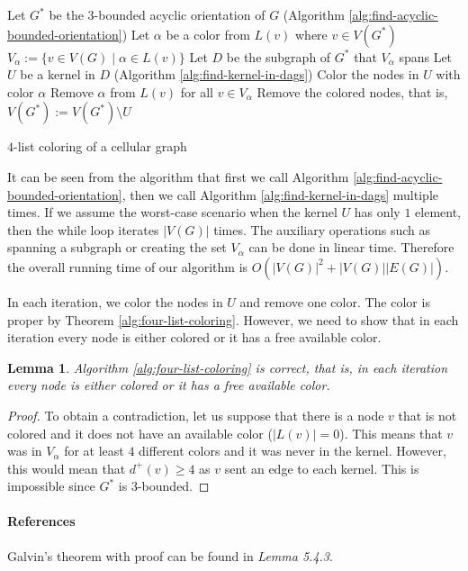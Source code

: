 \documentclass[a4paper, 12pt]{article}
\newtheorem{lem}{Lemma}[section]
\begin{document}
\begin{algorithm}[h!]\label{alg:four-list-coloring}
  Let $G^*$ be the $3$-bounded acyclic orientation of $G$ (Algorithm \ref{alg:find-acyclic-bounded-orientation})\;
   {
  	Let $\alpha$ be a color from $L(v)$ where $v \in V(G^*)$\;
  	$V_\alpha := \lbrace v \in V(G) \mid \alpha \in L(v) \rbrace$\;
  	Let $D$ be the subgraph of $G^*$ that $V_\alpha$ spans\;
  	Let $U$ be a kernel in $D$ (Algorithm \ref{alg:find-kernel-in-dags})\;
  	Color the nodes in $U$ with color $\alpha$\;
  	Remove $\alpha$ from $L(v)$ for all $v \in V_\alpha$\;
  	Remove the colored nodes, that is, $V(G^*) := V(G^*) \setminus U$\;
  }
 \caption{$4$-list coloring of a cellular graph}
\end{algorithm}

It can be seen from the algorithm that first we call Algorithm \ref{alg:find-acyclic-bounded-orientation}, then we call Algorithm \ref{alg:find-kernel-in-dags} multiple times. If we assume the worst-case scenario when the kernel $U$ has only $1$ element, then the while loop iterates $|V(G)|$ times. The auxiliary operations such as spanning a subgraph or creating the set $V_\alpha$ can be done in linear time. Therefore the overall running time of our algorithm is $O(|V(G)|^2+|V(G)||E(G)|)$.

In each iteration, we color the nodes in $U$ and remove one color. The color is proper by Theorem \ref{alg:four-list-coloring}. However, we need to show that in each iteration every node is either colored or it has a free available color.
\begin{lem} Algorithm \ref{alg:four-list-coloring} is correct, that is, in each iteration every node is either colored or it has a free available color.
\end{lem}
\begin{proof} To obtain a contradiction, let us suppose that there is a node $v$ that is not colored and it does not have an available color ($|L(v)|=0$). This means that $v$ was in $V_{\alpha}$ for at least $4$ different colors and it was never in the kernel. However, this would mean that $d^+(v) \geqslant 4$ as $v$ sent an edge to each kernel. This is impossible since $G^*$ is $3$-bounded.
\end{proof}

\paragraph*{References} Galvin's theorem with proof can be found in \cite{citeulike:395714} \textit{Lemma 5.4.3}.
\end{document}
